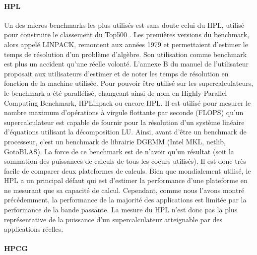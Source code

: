        \paragraph{HPL \cite{Dongarra2003}} 
            Un des micros benchmarks les plus utilisés est sans doute celui du HPL, utilisé pour construire le classement du Top500 \cite{HPC:top500}. Les premières versions du benchmark, alors appelé LINPACK, remontent aux années 1979 et permettaient d'estimer le temps de résolution d'un problème d'algèbre. Son utilisation comme benchmark est plus un accident qu'une réelle volonté. L'annexe B du manuel de l'utilisateur proposait aux utilisateurs d'estimer et de noter les temps de résolution en fonction de la machine utilisée. Pour pouvoir être utilisé sur les supercalculateurs, le benchmark a été parallélisé, changeant ainsi de nom en Highly Parallel Computing Benchmark, HPLinpack ou encore HPL. Il est utilisé pour mesurer le nombre maximum d'opérations à virgule flottante par seconde (\gls{FLOPS}) qu'un supercalculateur est capable de fournir pour la résolution d'un système linéaire d'équations utilisant la décomposition LU. Ainsi, avant d'être un benchmark de processeur, c'est un benchmark de librairie DGEMM (Intel MKL, netlib, GotoBLAS). La force de ce benchmark est de n'avoir qu'un résultat (soit la sommation des puissances de calculs de tous les coeurs utilisés). Il est donc très facile de comparer deux plateformes de calculs. Bien que mondialement utilisé, le HPL a un principal défaut qui est d'estimer la performance d'une plateforme en ne mesurant que sa capacité de calcul. Cependant, comme nous l'avons montré précédemment, la performance de la majorité des applications est limitée par la performance de la bande passante. La mesure du HPL n'est donc pas la plus représentative de la puissance d'un supercalculateur atteignable par des applications réelles. 
        
        \paragraph{HPCG \cite{Dongarra2013}} 
        \label{sec:hpcg}
            
